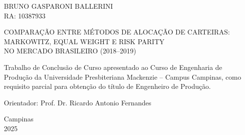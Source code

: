
\thispagestyle{empty}

\begin{center}

\vspace*{2cm}

{\fontsize{12}{14.4}\selectfont\MakeUppercase{BRUNO GASPARONI BALLERINI}}\\[0.3cm]
{\fontsize{12}{14.4}\selectfont RA: 10387933}

\vspace{4cm}

{\fontsize{12}{14.4}\selectfont\MakeUppercase{%
COMPARAÇÃO ENTRE MÉTODOS DE ALOCAÇÃO DE CARTEIRAS:\\[0.3cm]
MARKOWITZ, EQUAL WEIGHT E RISK PARITY\\[0.3cm]
NO MERCADO BRASILEIRO (2018–2019)%
}}

\vspace{3cm}

\end{center}

\begin{flushright}
\begin{minipage}{8cm}
\fontsize{11}{13.2}\selectfont
\setlength{\parindent}{0cm}
\setlength{\parskip}{0pt}

Trabalho de Conclusão de Curso apresentado ao Curso de Engenharia de Produção da Universidade Presbiteriana Mackenzie -- Campus Campinas, como requisito parcial para obtenção do título de Engenheiro de Produção.

\vspace{1.5cm}

\noindent Orientador: Prof. Dr. Ricardo Antonio Fernandes

\end{minipage}
\end{flushright}

\vfill

\begin{center}
{\fontsize{12}{14.4}\selectfont
Campinas\\[0.3cm]
2025}
\end{center}